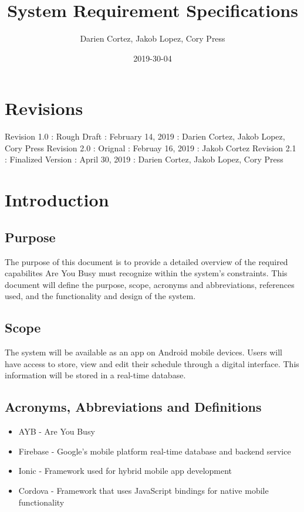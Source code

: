\documentclass{article}
\title{System Requirement Specifications}
\date{2019-30-04}
\author{Darien Cortez, Jakob Lopez, Cory Press}
\begin{document}
  \maketitle
  \newpage

  \tableofcontents

  \section{Revisions}
  Revision 1.0 : Rough Draft : February 14, 2019 : Darien Cortez, Jakob Lopez, Cory Press
  Revision 2.0 : Orignal : Februay 16, 2019 : Jakob Cortez
  Revision 2.1 : Finalized Version : April 30, 2019 : Darien Cortez, Jakob Lopez, Cory Press
  
  \section{Introduction}
  \subsection{Purpose} 
  The purpose of this document is to provide a detailed overview of the required capabilites 
  Are You Busy must recognize within the system's constraints. This document will define the 
  purpose, scope, acronyms and abbreviations, references used, and the functionality and design 
  of the system.   
  \subsection{Scope}  
  The system will be available as an app on Android mobile devices. Users will have access to 
  store, view and edit their schedule through a digital interface. This information will be stored in a 
  real-time database.
  \subsection{Acronyms, Abbreviations and Definitions}
  \begin{itemize}
    \item AYB - Are You Busy
    \item Firebase - Google's mobile platform real-time database and backend service
    \item Ionic - Framework used for hybrid mobile app development
    \item Cordova - Framework that uses JavaScript bindings for native mobile functionality
  \end{itemize}
\end{document}
